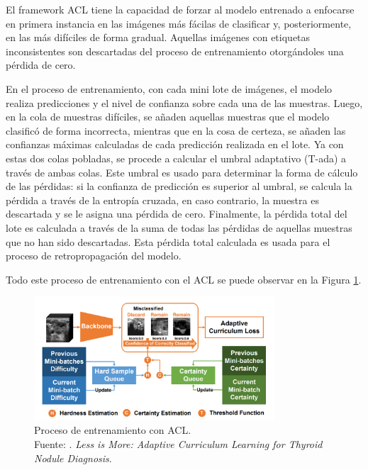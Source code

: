 El framework ACL tiene la capacidad de forzar al modelo entrenado a enfocarse en primera instancia en las imágenes más fácilas de clasificar y, posteriormente, en las más difíciles de forma gradual. Aquellas imágenes con etiquetas inconsistentes son descartadas del proceso de entrenamiento otorgándoles una pérdida de cero.

En el proceso de entrenamiento, con cada mini lote de imágenes, el modelo realiza predicciones y el nivel de confianza sobre cada una de las muestras. Luego, en la cola de muestras difíciles, se añaden aquellas muestras que el modelo clasificó de forma incorrecta, mientras que en la cosa de certeza, se añaden las confianzas máximas calculadas de cada predicción realizada en el lote. Ya con estas dos colas pobladas, se procede a calcular el umbral adaptativo (T-ada) a través de ambas colas. Este umbral es usado para determinar la forma de cálculo de las pérdidas: si la confianza de predicción es superior al umbral, se calcula la pérdida a través de la entropía cruzada, en caso contrario, la muestra es descartada y se le asigna una pérdida de cero. Finalmente, la pérdida total del lote es calculada a través de la suma de todas las pérdidas de aquellas muestras que no han sido descartadas. Esta pérdida total calculada es usada para el proceso de retropropagación del modelo.

Todo este proceso de entrenamiento con el ACL se puede observar en la Figura \ref{2:fig123}.

\begin{figure}[H]
	\begin{center}
		\includegraphics[width=0.80\textwidth]{2/figures/acl_process.png}
		\caption[Proceso de entrenamiento con ACL]{Proceso de entrenamiento con ACL. \\
		Fuente: \cite{pr_gong2022ACL}. \textit{Less is More: Adaptive Curriculum Learning for Thyroid Nodule Diagnosis}.}
		\label{2:fig123}
	\end{center}
\end{figure}

